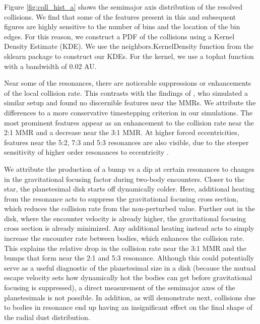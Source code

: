 \documentclass[onecolumn]{aastex63}
\begin{document}
Figure \ref{fig:coll_hist_a} shows the semimajor axis distribution of the resolved collisions. We find that some of the features present in this and subsequent figures are highly sensitive to the number of bins and the location of the bin edges. For this reason, we construct a PDF of the collisions using a Kernel Density Estimate (KDE). We use the {\sc neighbors.KernelDensity} function from the {\sc sklearn} \citep{scikit-learn} package to construct our KDEs. For the kernel, we use a tophat function with a bandwidth of 0.02 AU.

Near some of the resonances, there are noticeable suppressions or enhancements of the local collision rate. This contrasts with the findings of \citet{2000Icar..143...45R}, who simulated a similar setup and found no discernible features near the MMRs. We attribute the differences to  a more conservative timestepping criterion in our simulations. The most prominent features appear as an enhancement to the collision rate near the 2:1 MMR and a decrease near the 3:1 MMR. At higher forced eccentricities, features near the 5:2, 7:3 and 5:3 resonances are also visible, due to the steeper sensitivity of higher order resonances to eccentricity \citep{1994PhyD...77..289M}.

We attribute the production of a bump vs a dip at certain resonances to changes in the gravitational focusing factor during two-body encounters. Closer to the star, the planetesimal disk starts off dynamically colder. Here, additional heating from the resonance acts to suppress the gravitational focusing cross section, which reduces the collision rate from the non-perturbed value. Further out in the disk, where the encounter velocity is already higher, the gravitational focusing cross section is already minimized. Any additional heating instead acts to simply increase the encounter rate between bodies, which enhances the collision rate. This explains the relative drop in the collision rate near the 3:1 MMR and the bumps that form near the 2:1 and 5:3 resonance. Although this could potentially serve as a useful diagnostic of the planetesimal size in a disk (because the mutual escape velocity sets how dynamically hot the bodies can get before gravitational focusing is suppressed), a direct measurement of the semimajor axes of the planetesimals is not possible. In addition, as will demonstrate next, collisions due to bodies in resonance end up having an insignificant effect on the final shape of the radial dust distribution.
\end{document}

